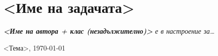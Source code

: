 \documentclass{article}
\begin{document}

\section*{<Име на задачата>} %

\begin{flushright}
\textit{\textbf{<Име на автора + клас (незадължително)>} е в настроение за\dots} %

<Тема>, \today
\end{flushright}
\end{document}
